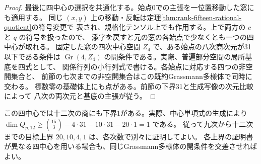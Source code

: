 \begin{proof}
最後に四中心の選択を共通化する。始点0での主張を一位置移動した窓にも適用する。
同じ $(x,y)$ 上の移動・反転は定理\ref{thm:rank-fifteen-rational-quotient}の符号変更で
表され、規格化テンソル上でも作用する。上で両方の $c$ と $q$ の符号を扱ったので、
添字を戻すと元の窓の各始点で少なくとも一つの四中心が取れる。
固定した窓の四次中心空間 $Z_4$ で、ある始点の八次商次元が31以下である条件は
$\operatorname{Gr}(4,Z_4)$ の開条件である。実際、普遍部分空間の局所基底を四式として、
関係行列の小行列式で書ける。各始点に対応する四つの非空開集合と、
前節の七次までの非空開集合はこの既約Grassmann多様体で同時に交わる。
標数零の基礎体上にも点がある。前節の下界31と生成写像の次元比較によって
八次の両次元と基底の主張が従う。
\end{proof}

\begin{corollary}
この四中心では十二次の商にも下界1がある。実際、中心単項式の生成により
$\dim Q_{p,12}\ge\binom{15}{3}-4\cdot31-10\cdot31-20\cdot1=1$ である。
従って九次から十二次までの目標上界 $20,10,4,1$ は、各次数で別々に証明してよい。
各上界の証明書が異なる四中心を用いる場合も、同じGrassmann多様体の開条件を交差させればよい。
\end{corollary}

